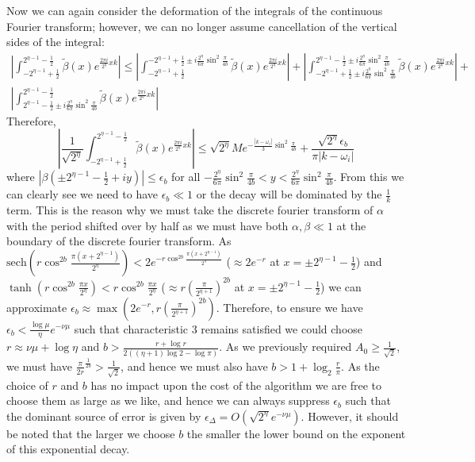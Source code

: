 \documentclass[aps,floatfix,10pt,amssymb,amsfont,amsmath,superscriptaddress,float,nofootinbib,longbibliography,nobalancelastpage,twocolumn]{revtex4-2}
\begin{document}
Now we can again consider the deformation of the integrals of the continuous Fourier transform; however, we can no longer assume cancellation of the vertical sides of the integral:
\begin{multline}
     \left|\int_{-2^{\eta-1}+\frac{1}{2}}^{2^{\eta-1}-\frac{1}{2}}\tilde\beta(x)e^{\frac{2\pi i}{2^{\eta}}xk}\right| \leq \left|\int_{-2^{\eta-1}+\frac{1}{2}}^{-2^{\eta-1}+\frac{1}{2}\pm i\frac{2^{\eta}}{6\pi}\sin^2\frac{\pi}{4b}}\tilde\beta(x)e^{\frac{2\pi i}{2^{\eta}}xk}\right|+\left|\int_{-2^{\eta-1}+\frac{1}{2}\pm i\frac{2^{\eta}}{6\pi}\sin^2\frac{\pi}{4b}}^{2^{\eta-1}-\frac{1}{2}\pm i\frac{2^{\eta}}{6\pi}\sin^2\frac{\pi}{4b}}\tilde\beta(x)e^{\frac{2\pi i}{2^{\eta}}xk}\right|+\\\left|\int_{2^{\eta-1}-\frac{1}{2}\pm i \frac{2^{\eta}}{6\pi}\sin^2\frac{\pi}{4b}}^{2^{\eta-1}-\frac{1}{2}}\tilde\beta(x)e^{\frac{2\pi i}{2^{\eta}}xk}\right|
\end{multline}
Therefore,
\begin{equation}
    \left|\frac{1}{\sqrt{2^{\eta}}}\int_{-2^{\eta-1}+\frac{1}{2}}^{2^{\eta-1}-\frac{1}{2}}\tilde\beta(x)e^{\frac{2\pi i}{2^{\eta}}xk}\right| \leq \sqrt{2^{\eta}}Me^{-\frac{|k-\omega_{i}|}{3}\sin^2 \frac{\pi}{4b}} + \frac{\sqrt{2^{\eta}}\epsilon_b}{\pi|k-\omega_{i}|}
\end{equation}
where $|\beta(\pm2^{\eta-1}-\frac{1}{2}+iy)| \leq\epsilon_b$ for all $-\frac{2^{\eta}}{6\pi}\sin^2\frac{\pi}{4b}<y<\frac{2^{\eta}}{6\pi}\sin^2\frac{\pi}{4b}$. From this we can clearly see we need to have $\epsilon_b \ll 1$ or the decay will be dominated by the $\frac{1}{k}$ term. This is the reason why we must take the discrete fourier transform of $\alpha$ with the period shifted over by half as we must have both $\alpha, \beta \ll 1$ at the boundary of the discrete fourier transform. As $\text{sech}( r\cos^{2b} \frac{\pi (x+2^{\eta-1})}{2^{\eta}})< 2e^{-r\cos^{2b} \frac{\pi (x+2^{\eta-1})}{2^{\eta}}}$ ($\approx 2e^{-r}$ at $x=\pm2^{\eta-1}-\frac{1}{2}$) and $\tanh (r\cos^{2b} \frac{\pi x}{2^{\eta}}) < r\cos^{2b} \frac{\pi x}{2^{\eta}}$ ($\approx r (\frac{\pi}{2^{\eta+1}})^{2b}$ at $x=\pm2^{\eta-1}-\frac{1}{2}$) we can approximate $\epsilon_b \approx \max(2e^{-r},r (\frac{\pi}{2^{\eta+1}})^{2b})$. Therefore, to ensure we have $\epsilon_b < \frac{\log\mu }{\eta}e^{-\nu\mu}$ such that characteristic 3 remains satisfied we could choose  $r\approx \nu\mu+\log \eta$ and $b > \frac{r+\log r}{2((\eta+1)\log 2 - \log \pi)}$. As we previously required $A_0 \geq \frac{1}{\sqrt{2}}$, we must have $\frac{\pi}{2r}^{\frac{1}{2b}} > \frac{1}{\sqrt{2}}$, and hence we must also have $b > 1 + \log_2 \frac{r}{\pi}$. As the choice of $r$ and $b$ has no impact upon the cost of the algorithm we are free to choose them as large as we like, and hence we can always suppress $\epsilon_b$ such that the dominant source of error is given by $\epsilon_{\Delta} = O(\sqrt{2^{\eta}}e^{-\nu\mu})$. However, it should be noted that the larger we choose $b$ the smaller the lower bound on the exponent of this exponential decay.
\end{document}
